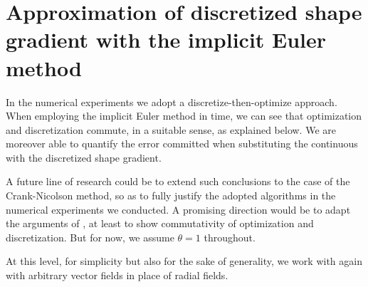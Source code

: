 \documentclass[english,a4paper,10pt,oneside]{scrbook}	%
\theoremstyle{break}
\theoremstyle{remark}
\begin{document}
\section{Approximation of discretized shape gradient with the implicit Euler method}

In the numerical experiments we adopt a discretize-then-optimize approach. When employing the implicit Euler method in time, we can see that optimization and discretization commute, in a suitable sense, as explained below. We are moreover able to quantify the error committed when substituting the continuous with the discretized shape gradient. 

A future line of research could be to extend such conclusions to the case of the Crank-Nicolson method, so as to fully justify the adopted algorithms in the numerical experiments we conducted. A promising direction would be to adapt the arguments of \cite{flaig}, at least to show commutativity of optimization and discretization. But for now, we assume $\theta = 1$ throughout.

At this level, for simplicity but also for the sake of generality, we work with again with arbitrary vector fields in place of radial fields.
\end{document}
